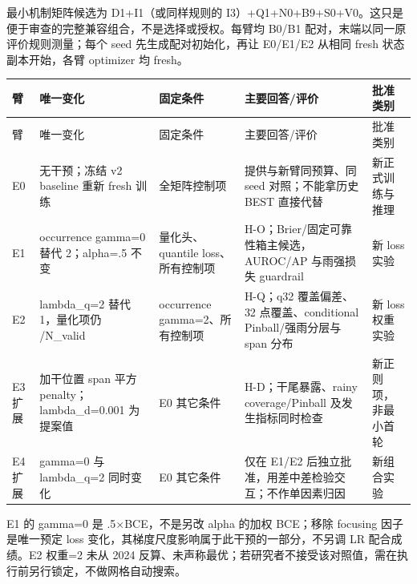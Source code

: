 \documentclass[UTF8,fontset=fandol,10pt]{ctexart}
\begin{document}
最小机制矩阵候选为 D1+I1（或同样规则的 I3）+Q1+N0+B9+S0+V0。这只是便于审查的完整兼容组合，不是选择或授权。每臂均 B0/\allowbreak{}B1 配对，末端以同一原评价规则测量；每个 seed 先生成配对初始化，再让 E0/\allowbreak{}E1/\allowbreak{}E2 从相同 fresh 状态副本开始，各臂 optimizer 均 fresh。

\begingroup\small\setlength{\tabcolsep}{3pt}\renewcommand{\arraystretch}{1.12}
\begin{longtable}{>{\raggedright\arraybackslash}p{\dimexpr(\linewidth-10\tabcolsep)/5\relax}>{\raggedright\arraybackslash}p{\dimexpr(\linewidth-10\tabcolsep)/5\relax}>{\raggedright\arraybackslash}p{\dimexpr(\linewidth-10\tabcolsep)/5\relax}>{\raggedright\arraybackslash}p{\dimexpr(\linewidth-10\tabcolsep)/5\relax}>{\raggedright\arraybackslash}p{\dimexpr(\linewidth-10\tabcolsep)/5\relax}}
\toprule
臂 & 唯一变化 & 固定条件 & 主要回答/\allowbreak{}评价 & 批准类别 \\
\midrule\endfirsthead
臂 & 唯一变化 & 固定条件 & 主要回答/\allowbreak{}评价 & 批准类别 \\
\midrule\endhead
E0 & 无干预；冻结 v2 baseline 重新 fresh 训练 & 全矩阵控制项 & 提供与新臂同预算、同 seed 对照；不能拿历史 BEST 直接代替 & 新正式训练与推理 \\
E1 & occurrence gamma=0 替代 2；alpha=.5 不变 & 量化头、quantile loss、所有控制项 & H-O；Brier/\allowbreak{}固定可靠性箱主候选，AUROC/\allowbreak{}AP 与雨强损失 guardrail & 新 loss 实验 \\
E2 & lambda\_\allowbreak{}q=2 替代 1，量化项仍 /\allowbreak{}N\_\allowbreak{}valid & occurrence gamma=2、所有控制项 & H-Q；q32 覆盖偏差、32 点覆盖、conditional Pinball/\allowbreak{}强雨分层与 span 分布 & 新 loss 权重实验 \\
E3 扩展 & 加干位置 span 平方 penalty；lambda\_\allowbreak{}d=0.001 为提案值 & E0 其它条件 & H-D；干尾暴露、rainy coverage/\allowbreak{}Pinball 及发生指标同时检查 & 新正则项，非最小首轮 \\
E4 扩展 & gamma=0 与 lambda\_\allowbreak{}q=2 同时变化 & E0 其它条件 & 仅在 E1/\allowbreak{}E2 后独立批准，用差中差检验交互；不作单因素归因 & 新组合实验 \\
\bottomrule\end{longtable}\endgroup

E1 的 gamma=0 是 .5\(\times\)BCE，不是另改 alpha 的加权 BCE；移除 focusing 因子是唯一预定 loss 变化，其梯度尺度影响属于此干预的一部分，不另调 LR 配合成绩。E2 权重=2 未从 2024 反算、未声称最优；若研究者不接受该对照值，需在执行前另行锁定，不做网格自动搜索。
\end{document}
